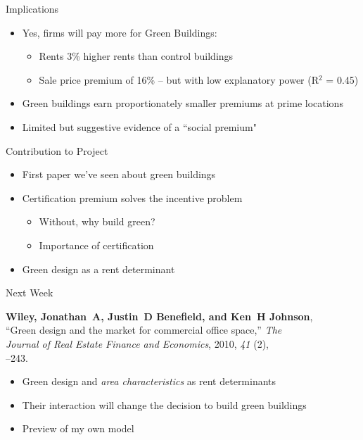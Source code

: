 \documentclass[11pt]{beamer}
\begin{document}
\begin{frame}{Implications}

\begin{itemize}
\item Yes, firms will pay more for Green Buildings:
\begin{itemize}
	\item Rents 3\% higher rents than control buildings
	\item Sale price premium of 16\% -- but with low explanatory power (R$^2$ = 0.45)
\end{itemize}
\vfill
\item Green buildings earn proportionately smaller premiums at prime locations
\vfill
\item Limited but suggestive evidence of a ``social premium"
\end{itemize}

\end{frame}


\begin{frame}{Contribution to Project}


\begin{itemize}
	\item First paper we've seen about green buildings
	
	\vfill
	\item Certification premium solves the incentive problem
	\begin{itemize}
		\item Without, why build green?
		\item Importance of certification
	\end{itemize}
	
	\vfill
	\item Green design as a rent determinant
\end{itemize}

\end{frame}


\begin{frame}{Next Week}

{\bf Wiley, Jonathan~A, Justin~D Benefield, and Ken~H Johnson},\\
\quad  ``Green design and the market for commercial office space,'' {\it The\\
\quad  Journal of Real Estate Finance and Economics}, 2010, {\it 41} (2),\\ 
--243.

\vfill
\begin{itemize}
	\item Green design and \emph{area characteristics} as rent determinants
	\item Their interaction will change the decision to build green buildings
	\item Preview of my own model
\end{itemize}

\end{frame}
\end{document}
